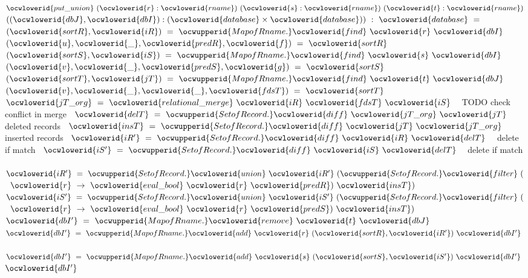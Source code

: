 \documentclass[12pt]{article}
\begin{document}
\label{rellens.ml:26951}%
\ocwindent{0.00em}
~$\ocwlowerid{put\_union}~(\ocwlowerid{r}:\ocwlowerid{rname})~(\ocwlowerid{s}:\ocwlowerid{rname})~(\ocwlowerid{t}:\ocwlowerid{rname})$\ocweol
\ocwindent{2.00em}
$((\ocwlowerid{dbJ},\ocwlowerid{dbI}):(\ocwlowerid{database}\times{}\ocwlowerid{database}))~:~\ocwlowerid{database}~=$\ocweol
\ocwindent{1.00em}
~$(\ocwlowerid{sortR},\ocwlowerid{iR})~=~\ocwupperid{MapofRname.}\ocwlowerid{find}~\ocwlowerid{r}~\ocwlowerid{dbI}~$\ocweol
\ocwindent{1.00em}
~$(\ocwlowerid{u},\ocwlowerid{\_},\ocwlowerid{predR},\ocwlowerid{f})~=~\ocwlowerid{sortR}~$\ocweol
\ocwindent{1.00em}
~$(\ocwlowerid{sortS},\ocwlowerid{iS})~=~\ocwupperid{MapofRname.}\ocwlowerid{find}~\ocwlowerid{s}~\ocwlowerid{dbI}~$\ocweol
\ocwindent{1.00em}
~$(\ocwlowerid{v},\ocwlowerid{\_},\ocwlowerid{predS},\ocwlowerid{g})~=~\ocwlowerid{sortS}~$\ocweol
\ocwindent{1.00em}
~$(\ocwlowerid{sortT},\ocwlowerid{jT})~=~\ocwupperid{MapofRname.}\ocwlowerid{find}~\ocwlowerid{t}~\ocwlowerid{dbJ}~$\ocweol
\ocwindent{1.00em}
~$(\ocwlowerid{v},\ocwlowerid{\_},\ocwlowerid{\_},\ocwlowerid{fdsT})~=~\ocwlowerid{sortT}~$\ocweol
\ocwindent{1.00em}
~$\ocwlowerid{jT\_org}~=~\ocwlowerid{relational\_merge}~\ocwlowerid{iR}~\ocwlowerid{fdsT}~\ocwlowerid{iS}~$~\ocwbc{} TODO check conflict in merge \ocwec{}\ocweol
\ocwindent{1.00em}
~$\ocwlowerid{delT}~=~\ocwupperid{SetofRecord.}\ocwlowerid{diff}~\ocwlowerid{jT\_org}~\ocwlowerid{jT}~$~\ocwbc{} deleted records \ocwec{}\ocweol
\ocwindent{1.00em}
~$\ocwlowerid{insT}~=~\ocwupperid{SetofRecord.}\ocwlowerid{diff}~\ocwlowerid{jT}~\ocwlowerid{jT\_org}~$~\ocwbc{} inserted records \ocwec{}\ocweol
\ocwindent{1.00em}
~$\ocwlowerid{iR'}~=~\ocwupperid{SetofRecord.}\ocwlowerid{diff}~\ocwlowerid{iR}~\ocwlowerid{delT}~$~\ocwbc{} delete if match \ocwec{}\ocweol
\ocwindent{1.00em}
~$\ocwlowerid{iS'}~=~\ocwupperid{SetofRecord.}\ocwlowerid{diff}~\ocwlowerid{iS}~\ocwlowerid{delT}~$~\ocwbc{} delete if match \ocwec{}\ocweol
\ocwindent{1.00em}
~$\ocwlowerid{iR'}~=~\ocwupperid{SetofRecord.}\ocwlowerid{union}~\ocwlowerid{iR'}~(\ocwupperid{SetofRecord.}\ocwlowerid{filter}~($~$\ocwlowerid{r}~\rightarrow{}~\ocwlowerid{eval\_bool}~\ocwlowerid{r}~\ocwlowerid{predR})~\ocwlowerid{insT})~$\ocweol
\ocwindent{1.00em}
~$\ocwlowerid{iS'}~=~\ocwupperid{SetofRecord.}\ocwlowerid{union}~\ocwlowerid{iS'}~(\ocwupperid{SetofRecord.}\ocwlowerid{filter}~($~$\ocwlowerid{r}~\rightarrow{}~\ocwlowerid{eval\_bool}~\ocwlowerid{r}~\ocwlowerid{predS})~\ocwlowerid{insT})~$\ocweol
\ocwindent{1.00em}
~$\ocwlowerid{dbI'}~=~\ocwupperid{MapofRname.}\ocwlowerid{remove}~\ocwlowerid{t}~\ocwlowerid{dbJ}~$\ocweol
\ocwindent{1.00em}
~$\ocwlowerid{dbI'}~=~\ocwupperid{MapofRname.}\ocwlowerid{add}~\ocwlowerid{r}~(\ocwlowerid{sortR},\ocwlowerid{iR'})~\ocwlowerid{dbI'}~$\ocweol
\ocwindent{1.00em}
~$\ocwlowerid{dbI'}~=~\ocwupperid{MapofRname.}\ocwlowerid{add}~\ocwlowerid{s}~(\ocwlowerid{sortS},\ocwlowerid{iS'})~\ocwlowerid{dbI'}~$\ocweol
\ocwindent{1.00em}
$\ocwlowerid{dbI'}$\medskip
\end{document}
